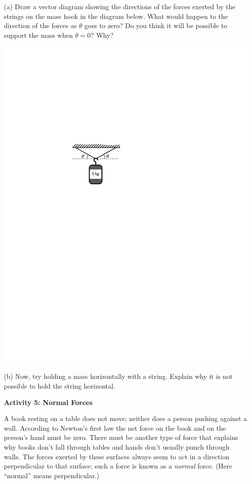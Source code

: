 (a) Draw a vector diagram showing the directions of the forces exerted by the
strings on the mass hook in the diagram below. What would happen to the direction
of the forces as \( \theta  \) goes to zero? Do you think it will be possible
to support the mass when $\theta  = 0$? Why?

\vspace{0.3cm}
\hspace{0.5in}\includegraphics[scale=1.2]{newton/newton_fig8_new.pdf}
\vspace{0.3cm}

(b) Now, try holding a mass horizontally with a string. Explain why it is not possible to hold the string horizontal.
\answerspace{20mm}

\textbf{Activity 5: Normal Forces} 

A book resting on a table does not move; neither does a person pushing against
a wall. According to Newton's first law the net force on the book and on the
person's hand must be zero. There must be another type of force
that explains why books don't fall through tables and hands don't usually punch
through walls. The forces exerted by these surfaces always seem to act in a direction perpendicular to that surface; such a force is known as a \textit{normal} force.  (Here ``normal'' means perpendicular.)

